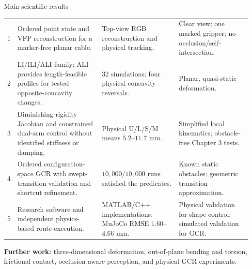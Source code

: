 \documentclass[aspectratio=169,10pt]{beamer}
\begin{document}
\begin{frame}[t]{Main scientific results}
  \fontsize{7.3}{8.0}\selectfont
  \renewcommand{\arraystretch}{1.08}
  \setlength{\tabcolsep}{4pt}
  \begin{tabularx}{\textwidth}{
    C{0.55cm}>{\RaggedRight\arraybackslash}p{4.25cm}YY}
    \toprule
     &  &
       & \\
     & Ordered point state and VFP reconstruction for a marker-free planar cable. &
      Top-view RGB reconstruction and physical tracking. &
      Clear view; one marked gripper; no occlusion/self-intersection.\\
    2 & LI/ILI/ALI family; ALI provides length-feasible profiles for tested
      opposite-concavity changes. &
      32 simulations; four physical concavity reversals. &
      Planar, quasi-static deformation.\\
    3 & Diminishing-rigidity Jacobian and constrained dual-arm control without
      identified stiffness or damping. &
      Physical U/L/S/M means \(5.2\)--\(11.7\) mm. &
      Simplified local kinematics; obstacle-free Chapter 3 tests.\\
    4 & Ordered configuration-space GCR with swept-transition validation and
      shortcut refinement. &
      \(10{,}000/10{,}000\) runs satisfied the predicates. &
      Known static obstacles; geometric transition approximation.\\
    5 & Research software and independent physics-based route execution. &
      MATLAB/C++ implementations; MuJoCo RMSE \(1.60\)--\(4.66\) mm. &
      Physical validation for shape control; simulated validation for GCR.\\
    \bottomrule
  \end{tabularx}

  \vspace{0.10cm}
  \footnotesize
  \textbf{Further work:} three-dimensional deformation, out-of-plane bending
  and torsion, frictional contact, occlusion-aware perception, and physical
  GCR experiments.
\end{frame}
\end{document}
